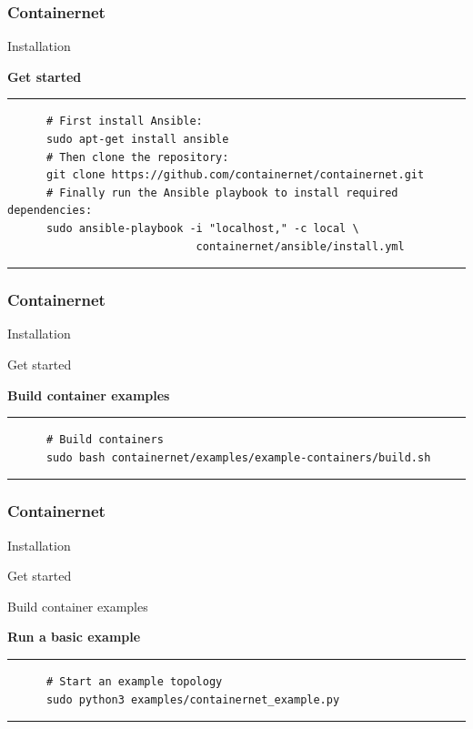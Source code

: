 \documentclass{beamer}
\begin{document}
\begin{frame}[fragile]
  \frametitle{Containernet}

    \begin{block}{Installation}
    \end{block}
    \begin{block}{\textbf{Get started}}
    \rule{\textwidth}{0.5pt}
    \small
    \begin{verbatim}
      # First install Ansible:
      sudo apt-get install ansible
      # Then clone the repository:
      git clone https://github.com/containernet/containernet.git
      # Finally run the Ansible playbook to install required dependencies:
      sudo ansible-playbook -i "localhost," -c local \
                             containernet/ansible/install.yml
  \end{verbatim}
  \rule{\textwidth}{0.5pt}
\end{block}
\end{frame}
\begin{frame}[fragile]
  \frametitle{Containernet}

    \begin{block}{Installation}
    \end{block}
    \begin{block}{Get started}
    \end{block}
    \begin{block}{\textbf{Build container examples}}
    \rule{\textwidth}{0.5pt}
    \small
    \begin{verbatim}
      # Build containers
      sudo bash containernet/examples/example-containers/build.sh
  \end{verbatim}
  \rule{\textwidth}{0.5pt}
\end{block}
\end{frame}
\begin{frame}[fragile]
  \frametitle{Containernet}
    \begin{block}{Installation}
    \end{block}
    \begin{block}{Get started}
    \end{block}
    \begin{block}{Build container examples}
    \end{block}
    \begin{block}{\textbf{Run a basic example}}
    \rule{\textwidth}{0.5pt}
    \small
    \begin{verbatim}
      # Start an example topology
      sudo python3 examples/containernet_example.py
  \end{verbatim}
  \rule{\textwidth}{0.5pt}
\end{block}
\end{frame}
\end{document}
